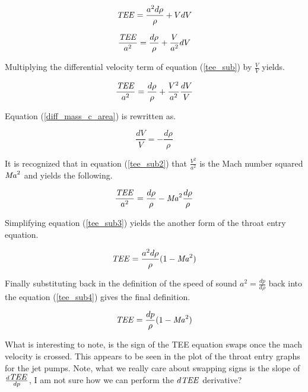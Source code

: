 \documentclass{article}
\newcommand\Mach{\mbox{\textit{Ma}}}  %
\newcommand\Tee{\mbox{\textit{TEE}}}  %
\begin{document}
\begin{equation}
    \Tee = \frac{a^2d\rho}{\rho} + VdV
\end{equation}

\begin{equation}
    \frac{\Tee}{a^2} = \frac{d\rho}{\rho} + \frac{V}{a^2}dV
    \label{tee_sub}
\end{equation}

Multiplying the differential velocity term of equation (\ref{tee_sub}) by $\frac{V}{V}$ yields.

\begin{equation}
    \frac{\Tee}{a^2} = \frac{d\rho}{\rho} + \frac{V^2}{a^2}\frac{dV}{V}
    \label{tee_sub2}
\end{equation}

Equation (\ref{diff_mass_c_area}) is rewritten as.

\begin{equation}
    \frac{dV}{V} = - \frac{d\rho}{\rho}
\end{equation}

It is recognized that in equation (\ref{tee_sub2}) that $\frac{V^2}{a^2}$ is the Mach number squared $\Mach^2$ and yields the following.

\begin{equation}
\frac{\Tee}{a^2} = \frac{d\rho}{\rho} - \Mach^2\frac{d\rho}{\rho}
\label{tee_sub3} 
\end{equation}

Simplifying equation (\ref{tee_sub3}) yields the another form of the throat entry equation.

\begin{equation}
    \Tee = \frac{a^2d\rho}{\rho}(1 - \Mach^2)
\label{tee_sub4}    
\end{equation}

Finally substituting back in the definition of the speed of sound $a^2 = \frac{dp}{d\rho}$ back into the equation (\ref{tee_sub4}) gives the final definition.

\begin{equation}
    \Tee = \frac{dp}{\rho}(1 - \Mach^2)
\label{tee_final}    
\end{equation}

What is interesting to note, is the sign of the TEE equation swaps once the mach velocity is crossed. This appears to be seen in the plot of the throat entry graphs for the jet pumps. Note, what we really care about swapping signs is the slope of $\frac{d\Tee}{dp}$, I am not sure how we can perform the $d\Tee$ derivative?
\end{document}

